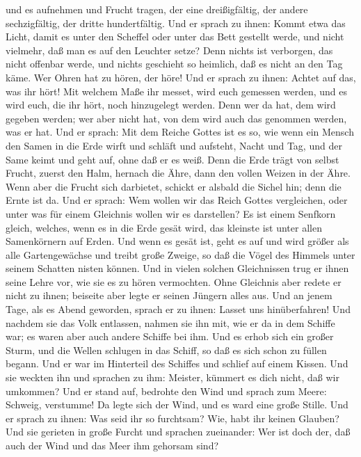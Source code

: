 und es aufnehmen und Frucht tragen, der eine dreißigfältig, der andere
sechzigfältig, der dritte hundertfältig.  Und er sprach
zu ihnen: Kommt etwa das Licht, damit es unter den Scheffel oder unter
das Bett gestellt werde, und nicht vielmehr, daß man es auf den Leuchter
setze?  Denn nichts ist verborgen, das nicht offenbar
werde, und nichts geschieht so heimlich, daß es nicht an den Tag käme.
 Wer Ohren hat zu hören, der höre!  Und er
sprach zu ihnen: Achtet auf das, was ihr hört! Mit welchem Maße ihr
messet, wird euch gemessen werden, und es wird euch, die ihr hört, noch
hinzugelegt werden.  Denn wer da hat, dem wird gegeben
werden; wer aber nicht hat, von dem wird auch das genommen werden, was
er hat.  Und er sprach: Mit dem Reiche Gottes ist es so,
wie wenn ein Mensch den Samen in die Erde wirft  und
schläft und aufsteht, Nacht und Tag, und der Same keimt und geht auf,
ohne daß er es weiß.  Denn die Erde trägt von selbst
Frucht, zuerst den Halm, hernach die Ähre, dann den vollen Weizen in der
Ähre.  Wenn aber die Frucht sich darbietet, schickt er
alsbald die Sichel hin; denn die Ernte ist da.  Und er
sprach: Wem wollen wir das Reich Gottes vergleichen, oder unter was für
einem Gleichnis wollen wir es darstellen?  Es ist einem
Senfkorn gleich, welches, wenn es in die Erde gesät wird, das kleinste
ist unter allen Samenkörnern auf Erden.  Und wenn es
gesät ist, geht es auf und wird größer als alle Gartengewächse und
treibt große Zweige, so daß die Vögel des Himmels unter seinem Schatten
nisten können.  Und in vielen solchen Gleichnissen trug
er ihnen seine Lehre vor, wie sie es zu hören vermochten.
 Ohne Gleichnis aber redete er nicht zu ihnen; beiseite
aber legte er seinen Jüngern alles aus.  Und an jenem
Tage, als es Abend geworden, sprach er zu ihnen: Lasset uns
hinüberfahren!  Und nachdem sie das Volk entlassen,
nahmen sie ihn mit, wie er da in dem Schiffe war; es waren aber auch
andere Schiffe bei ihm.  Und es erhob sich ein großer
Sturm, und die Wellen schlugen in das Schiff, so daß es sich schon zu
füllen begann.  Und er war im Hinterteil des Schiffes und
schlief auf einem Kissen. Und sie weckten ihn und sprachen zu ihm:
Meister, kümmert es dich nicht, daß wir umkommen?  Und er
stand auf, bedrohte den Wind und sprach zum Meere: Schweig, verstumme!
Da legte sich der Wind, und es ward eine große Stille. 
Und er sprach zu ihnen: Was seid ihr so furchtsam? Wie, habt ihr keinen
Glauben?  Und sie gerieten in große Furcht und sprachen
zueinander: Wer ist doch der, daß auch der Wind und das Meer ihm
gehorsam sind?

